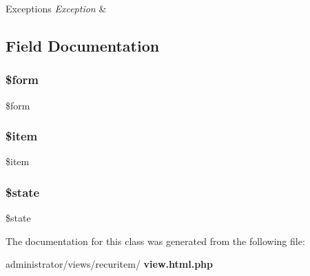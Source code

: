 \begin{DoxyExceptions}{Exceptions}
{\em Exception} & \\
\hline
\end{DoxyExceptions}


\subsection{Field Documentation}
\mbox{\label{classtks__agenda_view_recuritem_a1a4fda4c28a9ee5f91102c023b9501f4}} 
\subsubsection{\$form}
{\footnotesize\ttfamily \$form\hspace{0.3cm}{\ttfamily [protected]}}

\mbox{\label{classtks__agenda_view_recuritem_aa61b415cee119a7511e05c405ecd0b32}} 
\subsubsection{\$item}
{\footnotesize\ttfamily \$item\hspace{0.3cm}{\ttfamily [protected]}}

\mbox{\label{classtks__agenda_view_recuritem_ae82306c4f2d17d8dd5c7d8d916b33bed}} 
\subsubsection{\$state}
{\footnotesize\ttfamily \$state\hspace{0.3cm}{\ttfamily [protected]}}



The documentation for this class was generated from the following file\+:\begin{DoxyCompactItemize}
\item 
administrator/views/recuritem/\textbf{ view.\+html.\+php}\end{DoxyCompactItemize}
